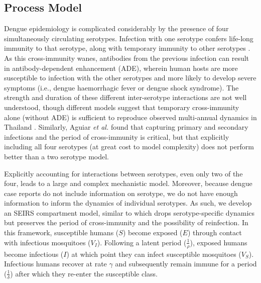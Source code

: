 \documentclass[10pt,letterpaper]{article}
\begin{document}
\subsection*{Process Model}

Dengue epidemiology is complicated considerably by the presence of four simultaneously circulating serotypes.
Infection with one serotype confers life-long immunity to that serotype, along with temporary immunity to other serotypes \cite{Wearing2006}.  
As this cross-immunity wanes, antibodies from the previous infection can result in antibody-dependent enhancement (ADE), wherein human hosts are more susceptible to infection with the other serotypes and more likely to develop severe symptoms (i.e., dengue haemorrhagic fever or dengue shock syndrome)\cite{Wearing2006}.
The strength and duration of these different inter-serotype interactions are not well understood, though different models suggest that temporary cross-immunity alone (without ADE) is sufficient to reproduce observed multi-annual dynamics in Thailand \cite{Wearing2006,Reich2013}.
Similarly, Aguiar \emph{et al.} \cite{Aguiar2013} found that capturing primary and secondary infections and the period of cross-immunity is critical, but that explicitly including all four serotypes (at great cost to model complexity) does not perform better than a two serotype model.

Explicitly accounting for interactions between serotypes, even only two of the four, leads to a large and complex mechanistic model.
Moreover, because dengue case reports do not include information on serotype, we do not have enough information to inform the dynamics of individual serotypes.
As such, we develop an SEIRS compartment model, similar to \cite{Newton1992, Burattini2008, Pinho2010} which drops serotype-specific dynamics but preserves the period of cross-immunity and the possibility of reinfection.
In this framework, susceptible humans ($S$) become exposed ($E$) through contact with infectious mosquitoes ($V_I$).
Following a latent period ($\frac{1}{\rho}$), exposed humans become infectious ($I$) at which point they can infect susceptible mosquitoes ($V_S$).
Infectious humans recover at rate $\gamma$ and subsequently remain immune for a period ($\frac{1}{\delta}$) after which they re-enter the susceptible class.
\end{document}
